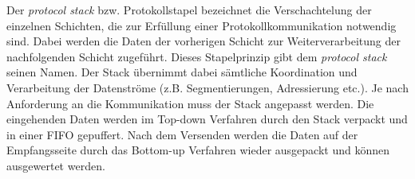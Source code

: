 Der \textit{protocol stack} bzw. Protokollstapel bezeichnet die Verschachtelung
der einzelnen Schichten, die zur Erf{\"u}llung einer Protokollkommunikation
notwendig sind. Dabei werden die Daten der vorherigen Schicht zur
Weiterverarbeitung der nachfolgenden Schicht zugef{\"u}hrt. Dieses Stapelprinzip
gibt dem \textit{protocol stack} seinen Namen. Der Stack {\"u}bernimmt dabei
s{\"a}mtliche Koordination und Verarbeitung der Datenstr{\"o}me (z.B.
Segmentierungen, Adressierung etc.).
Je nach Anforderung an die Kommunikation muss der Stack angepasst werden. Die
eingehenden Daten werden im Top-down Verfahren durch den Stack verpackt
und in einer \gls{FIFO} gepuffert. Nach dem Versenden werden die
Daten auf der Empfangsseite durch das Bottom-up Verfahren wieder ausgepackt und k{\"o}nnen
ausgewertet werden.
